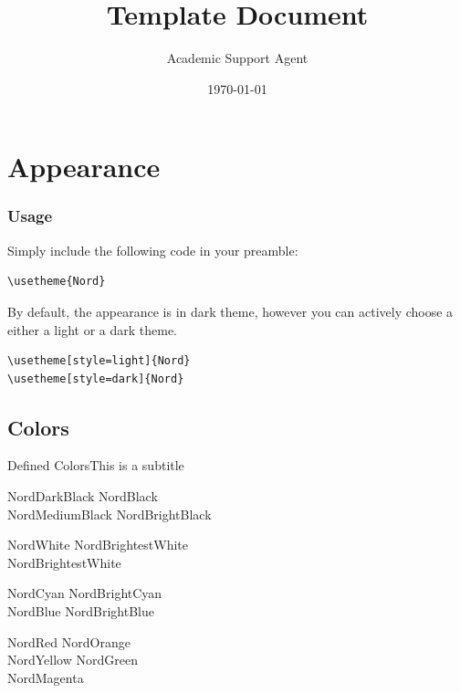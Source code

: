 \documentclass{article}
\title{Template Document}
\author{Academic Support Agent}
\date{\today}
\begin{document}
\maketitle

\begin{frame}
  \maketitle
\end{frame}


\section{Appearance}


\begin{frame}[fragile]
  \frametitle{Usage}
  Simply include the following code in your preamble:

  \begin{lstlisting}[basicstyle = \ttfamily\small]
\usetheme{Nord}
  \end{lstlisting}

  \bigskip

  By default, the appearance is in dark theme, however you can actively choose a either a light or a
  dark theme.

  \begin{lstlisting}[basicstyle = \ttfamily\small]
\usetheme[style=light]{Nord}
\usetheme[style=dark]{Nord}
  \end{lstlisting}

\end{frame}

\subsection{Colors}

\begin{frame}{Defined Colors}{This is a subtitle}
  \begin{description}
  \item[Polar Night]
    \textcolor{NordDarkBlack}{NordDarkBlack} \quad \textcolor{NordBlack}{NordBlack}\\
    \textcolor{NordMediumBlack}{NordMediumBlack} \quad \textcolor{NordBrightBlack}{NordBrightBlack}
  \item[Snow Storm]
    \textcolor{NordWhite}{NordWhite} \quad \textcolor{NordBrighterWhite}{NordBrightestWhite}\\
    \textcolor{NordBrightestWhite}{NordBrightestWhite}
  \item[Forest]
    \textcolor{NordCyan}{NordCyan} \quad \textcolor{NordBrightCyan}{NordBrightCyan}\\
    \textcolor{NordBlue}{NordBlue} \quad \textcolor{NordBrightBlue}{NordBrightBlue}
  \item[Aurora]
    \textcolor{NordRed}{NordRed} \quad \textcolor{NordOrange}{NordOrange} \\
    \textcolor{NordYellow}{NordYellow} \quad \textcolor{NordGreen}{NordGreen} \\
    \textcolor{NordMagenta}{NordMagenta}
  \end{description}
\end{frame}
\end{document}

